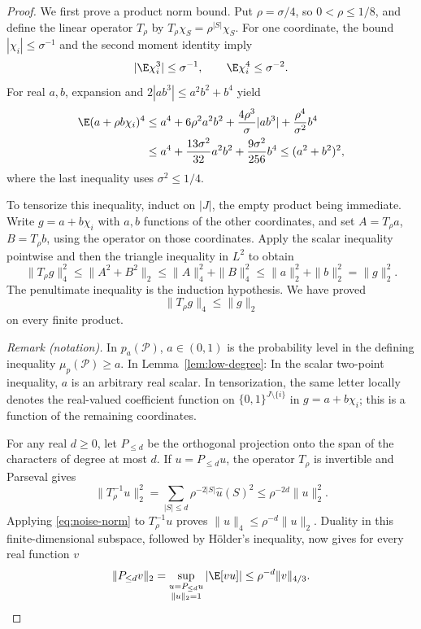 \begin{proof}
We first prove a product norm bound. Put $\rho=\sigma/4$, so
$0<\rho\le1/8$, and define the linear operator $T_\rho$ by
$T_\rho\chi_S=\rho^{|S|}\chi_S$. For one coordinate, the bound
$|\chi_i|\le\sigma^{-1}$ and the second moment identity imply
\[
  |\E\chi_i^3|\le\sigma^{-1},\qquad
  \E\chi_i^4\le\sigma^{-2}.
\]
For real $a,b$, expansion and
$2|ab^3|\le a^2b^2+b^4$ yield
\begin{align*}
  \E(a+\rho b\chi_i)^4
  &\le a^4+6\rho^2a^2b^2
       +\frac{4\rho^3}{\sigma}|ab^3|
       +\frac{\rho^4}{\sigma^2}b^4\\
  &\le a^4+\frac{13\sigma^2}{32}a^2b^2
       +\frac{9\sigma^2}{256}b^4
   \le(a^2+b^2)^2,
\end{align*}
where the last inequality uses $\sigma^2\le1/4$.

To tensorize this inequality, induct on $|J|$, the empty product being
immediate. Write $g=a+b\chi_i$ with $a,b$ functions of the other
coordinates, and set $A=T_\rho a$, $B=T_\rho b$, using the operator on
those coordinates. Apply the scalar inequality pointwise and then the
triangle inequality in $L^2$ to obtain
\[
  \|T_\rho g\|_4^2
  \le \|A^2+B^2\|_2
  \le \|A\|_4^2+\|B\|_4^2
  \le \|a\|_2^2+\|b\|_2^2
  =\|g\|_2^2.
\]
The penultimate inequality is the induction hypothesis. We have proved
\begin{equation}\label{eq:noise-norm}
  \|T_\rho g\|_4\le\|g\|_2
\end{equation}
on every finite product.

\noindent\textit{Remark (notation).} In $p_a(\mathcal P)$, $a\in(0,1)$ is the probability level in the defining inequality $\mu_p(\mathcal P)\ge a$. In Lemma~\ref{lem:low-degree}: In the scalar two-point inequality, $a$ is an arbitrary real scalar. In tensorization, the same letter locally denotes the real-valued coefficient function on $\{0,1\}^{J\setminus\{i\}}$ in $g=a+b\chi_i$; this is a function of the remaining coordinates.


For any real $d\ge0$, let $P_{\le d}$ be the orthogonal projection onto
the span of the characters of degree at most $d$. If $u=P_{\le d}u$,
the operator $T_\rho$ is invertible and Parseval gives
\[
  \|T_\rho^{-1}u\|_2^2
  =\sum_{|S|\le d}\rho^{-2|S|}\widehat u(S)^2
  \le\rho^{-2d}\|u\|_2^2.
\]
Applying \eqref{eq:noise-norm} to $T_\rho^{-1}u$ proves
$\|u\|_4\le\rho^{-d}\|u\|_2$. Duality in this finite-dimensional
subspace, followed by H\"older's inequality, now gives for every real
function $v$
\begin{equation}\label{eq:projection-norm}
  \|P_{\le d}v\|_2
  =\sup_{\substack{u=P_{\le d}u\\\|u\|_2=1}}|\E[vu]|
  \le\rho^{-d}\|v\|_{4/3}.
\end{equation}


\end{proof}
